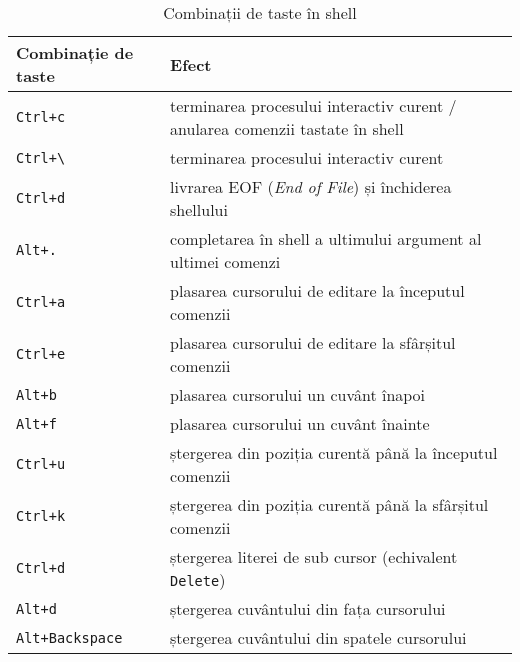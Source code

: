 \begin{table}[!htb]
  \begin{center}
    \begin{tabular}{ p{} p{} }
      \toprule
        \textbf{Combinație de taste} &
        \textbf{Efect} \\
      \midrule
        \texttt{Ctrl+c} &
        terminarea procesului interactiv curent / anularea comenzii tastate în shell \\

        \texttt{Ctrl+\textbackslash{}} &
        terminarea procesului interactiv curent \\

        \texttt{Ctrl+d} &
        livrarea EOF (\textit{End of File}) și închiderea shellului \\

        \texttt{Alt+.} &
        completarea în shell a ultimului argument al ultimei comenzi \\

        \texttt{Ctrl+a} &
        plasarea cursorului de editare la începutul comenzii \\

        \texttt{Ctrl+e} &
        plasarea cursorului de editare la sfârșitul comenzii \\

        \texttt{Alt+b} &
        plasarea cursorului un cuvânt înapoi \\

        \texttt{Alt+f} &
        plasarea cursorului un cuvânt înainte \\

        \texttt{Ctrl+u} &
        ștergerea din poziția curentă până la începutul comenzii \\

        \texttt{Ctrl+k} &
        ștergerea din poziția curentă până la sfârșitul comenzii \\

        \texttt{Ctrl+d} &
        ștergerea literei de sub cursor (echivalent \texttt{Delete}) \\

        \texttt{Alt+d} &
        ștergerea cuvântului din fața cursorului \\

        \texttt{Alt+Backspace} &
        ștergerea cuvântului din spatele cursorului \\
      \bottomrule
    \end{tabular}
  \end{center}
  \caption{Combinații de taste în shell}
  \label{tab:cli:key-bindings}
\end{table}

